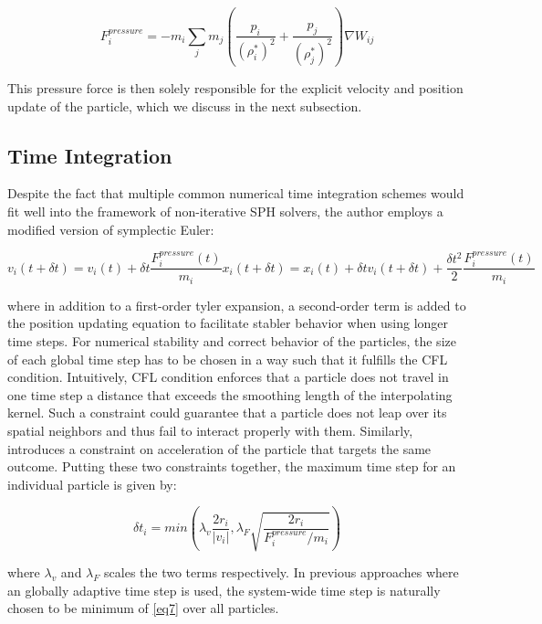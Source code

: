 \documentclass[
	11pt, 
	DIV10,
	ngerman,
	a4paper, 
	oneside, 
	headings=normal, 
	captions=tableheading,
	final, 
	numbers=noenddot
]{scrartcl}
\begin{document}
\begin{equation}
	\label{eq5}
	F_{i}^{pressure} = -m_{i}\sum_{j}m_{j}(\frac{p_{i}}{(\rho_{i}^{*})^{2}} + \frac{p_{j}}{(\rho_{j}^{*})^{2}})\nabla W_{ij}
\end{equation}

This pressure force is then solely responsible for the explicit velocity and position update of the particle, which we discuss in the next subsection.

\subsection{Time Integration}

Despite the fact that multiple common numerical time integration schemes would fit well into the framework of non-iterative SPH solvers, the author employs a modified version of symplectic Euler:

\begin{equation}
	\label{eq6}
	v_{i}(t + \delta t) = v_{i}(t) + \delta	t\frac{F_{i}^{pressure}(t)}{m_{i}}
	x_{i}(t + \delta t) = x_{i}(t) + \delta t v_{i}(t + \delta t) + \frac{\delta t^{2}}{2}\frac{F_{i}^{pressure}(t)}{m_{i}}
\end{equation}

where in addition to a first-order tyler expansion, a second-order term is added to the position updating equation to facilitate stabler behavior when using longer time steps. For numerical stability and correct behavior of the particles, the size of each global time step has to be chosen in a way such that it fulfills the CFL condition. Intuitively, CFL condition enforces that a particle does not travel in one time step a distance that exceeds the smoothing length of the interpolating kernel. Such a constraint could guarantee that a particle does not leap over its spatial neighbors and thus fail to interact properly with them. Similarly, \cite{PE:vriphys:vriphys10:079-088} introduces a constraint on acceleration of the particle that targets the same outcome. Putting these two constraints together, the maximum time step for an individual particle is given by:

\begin{equation}
	\label{eq7}
	\delta t_{i} = min(\lambda_{v}\frac{2r_{i}}{|v_{i}|}, \lambda_{F}\sqrt{\frac{2r_{i}}{F_{i}^{pressure}/m_{i}}})
\end{equation}

where $ \lambda_{v} $ and $ \lambda_{F} $ scales the two terms respectively. In previous approaches where an globally adaptive time step is used, the system-wide time step is naturally chosen to be minimum of \ref{eq7} over all particles.
\end{document}
